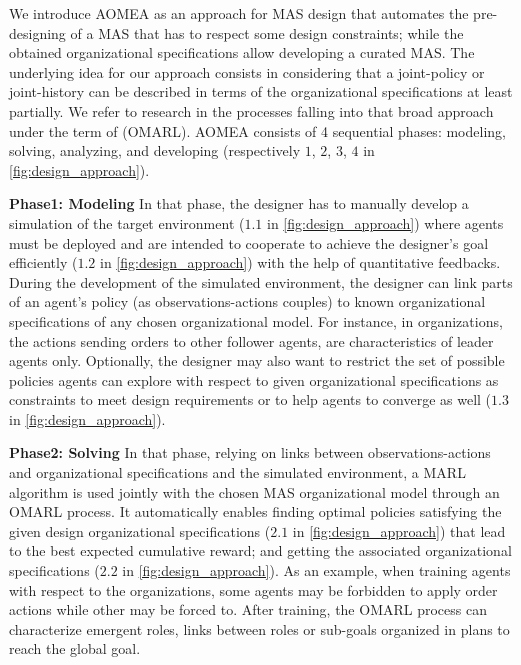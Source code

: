 \documentclass[runningheads]{llncs}
\begin{document}
We introduce AOMEA as an approach for MAS design that automates the pre-designing of a MAS that has to respect some design constraints; while the obtained organizational specifications allow developing a curated MAS.
The underlying idea for our approach consists in considering that a joint-policy or joint-history can be described in terms of the organizational specifications at least partially.
We refer to research in the processes falling into that broad approach under the term of  (OMARL).
%
%
AOMEA consists of 4 sequential phases: modeling, solving, analyzing, and developing (respectively $1$, $2$, $3$, $4$ in \autoref{fig:design_approach}).

\textbf{Phase1: Modeling} \quad In that phase, the designer has to manually develop a simulation of the target environment ($1.1$ in \autoref{fig:design_approach}) where agents must be deployed and are intended to cooperate to achieve the designer's goal efficiently ($1.2$ in \autoref{fig:design_approach}) with the help of quantitative feedbacks. During the development of the simulated environment, the designer can link parts of an agent's policy (as observations-actions couples) to known organizational specifications of any chosen organizational model.
For instance, in  organizations, the actions sending orders to other follower agents, are characteristics of leader agents only.
Optionally, the designer may also want to restrict the set of possible policies agents can explore with respect to given organizational specifications as constraints to meet design requirements or to help agents to converge as well ($1.3$ in \autoref{fig:design_approach}).

\textbf{Phase2: Solving} \quad In that phase, relying on links between observations-actions and organizational specifications and the simulated environment, a MARL algorithm is used jointly with the chosen MAS organizational model through an OMARL process. It automatically enables finding optimal policies satisfying the given design organizational specifications ($2.1$ in \autoref{fig:design_approach}) that lead to the best expected cumulative reward; and getting the associated organizational specifications ($2.2$ in \autoref{fig:design_approach}). As an example, when training agents with respect to the  organizations, some agents may be forbidden to apply order actions while other may be forced to. After training, the OMARL process can characterize emergent roles, links between roles or sub-goals organized in plans to reach the global goal.
\end{document}
